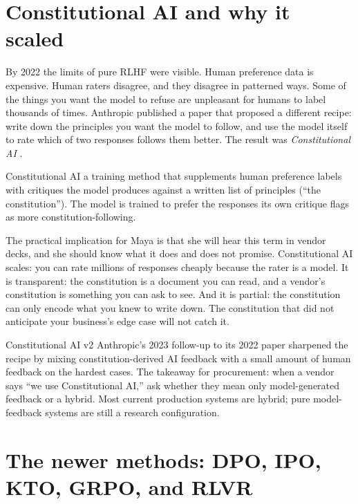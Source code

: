 \section{Constitutional AI and why it scaled}

By 2022 the limits of pure RLHF were visible. Human preference data is expensive. Human raters disagree, and they disagree in patterned ways. Some of the things you want the model to refuse are unpleasant for humans to label thousands of times. Anthropic published a paper that proposed a different recipe: write down the principles you want the model to follow, and use the model itself to rate which of two responses follows them better. The result was \textit{Constitutional AI} \citep{bai2022constitutional}.

\begin{TNdefinition}{Constitutional AI} a training method that supplements human preference labels with critiques the model produces against a written list of principles (``the constitution''). The model is trained to prefer the responses its own critique flags as more constitution-following. \end{TNdefinition}

The practical implication for Maya is that she will hear this term in vendor decks, and she should know what it does and does not promise. Constitutional AI scales: you can rate millions of responses cheaply because the rater is a model. It is transparent: the constitution is a document you can read, and a vendor's constitution is something you can ask to see. And it is partial: the constitution can only encode what you knew to write down. The constitution that did not anticipate your business's edge case will not catch it.

\begin{TNinpractice}{Constitutional AI v2} Anthropic's 2023 follow-up to its 2022 paper sharpened the recipe by mixing constitution-derived AI feedback with a small amount of human feedback on the hardest cases. The takeaway for procurement: when a vendor says ``we use Constitutional AI,'' ask whether they mean only model-generated feedback or a hybrid. Most current production systems are hybrid; pure model-feedback systems are still a research configuration. \end{TNinpractice}

\section{The newer methods: DPO, IPO, KTO, GRPO, and RLVR}

